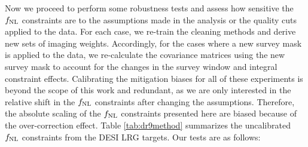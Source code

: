 Now we proceed to perform some robustness tests and assess how sensitive the $f_{\rm NL}$ constraints are to the assumptions made in the analysis or the quality cuts applied to the data. For each case, we re-train the cleaning methods and derive new sets of imaging weights. Accordingly, for the cases where a new survey mask is applied to the data, we re-calculate the covariance matrices using the new survey mask to account for the changes in the survey window and integral constraint effects. Calibrating the mitigation biases for all of these experiments is beyond the scope of this work and redundant, as we are only interested in the relative shift in the $f_{\rm NL}$ constraints after changing the assumptions. Therefore, the absolute scaling of the $f_{\rm NL}$ constraints presented here are biased because of the over-correction effect. Table \ref{tab:dr9method} summarizes the uncalibrated $f_{\rm NL}$ constraints from the DESI LRG targets. Our tests are as follows:

